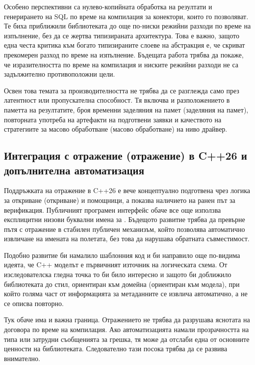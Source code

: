 Особено перспективни са нулево-копийната обработка на резултати и генерирането на SQL по време на компилация за конектори, които го позволяват. Те биха приближили библиотеката до още по-ниски режийни разходи по време на изпълнение, без да се жертва типизираната архитектура. Това е важно, защото една честа критика към богато типизираните слоеве на абстракция е, че скриват прекомерен разход по време на изпълнение. Бъдещата работа трябва да покаже, че изразителността по време на компилация и ниските режийни разходи не са задължително противоположни цели.

Освен това темата за производителността не трябва да се разглежда само през латентност или пропускателна способност. Тя включва и разположението в паметта на резултатите, броя временни заделяния на памет (заделяния на памет), повторната употреба на артефакти на подготвени заявки и качеството на стратегиите за масово обработване (масово обработване) на ниво драйвер.

\subsection{Интеграция с отражение (отражение) в C++26 и допълнителна автоматизация}

Поддръжката на отражение в C++26 е вече концептуално подготвена чрез логика за откриване (откриване) и помощници, а  показва наличието на ранен път за верификация. Публичният програмен интерфейс обаче все още използва експлицитни низови буквални имена за . Бъдещото развитие трябва да превърне пътя с отражение в стабилен публичен механизъм, който позволява автоматично извличане на имената на полетата, без това да нарушава обратната съвместимост.

Подобно развитие би намалило шаблонния код и би направило още по-видима идеята, че C++ моделът е първичният източник на логическата схема. От изследователска гледна точка то би било интересно и защото би доближило библиотеката до стил, ориентиран към домейна (ориентиран към модела), при който голяма част от информацията за метаданните се извлича автоматично, а не се описва повторно.

Тук обаче има и важна граница. Отражението не трябва да разрушава яснотата на договора по време на компилация. Ако автоматизацията намали прозрачността на типа или затрудни съобщенията за грешка, тя може да отслаби една от основните ценности на библиотеката. Следователно тази посока трябва да се развива внимателно.

